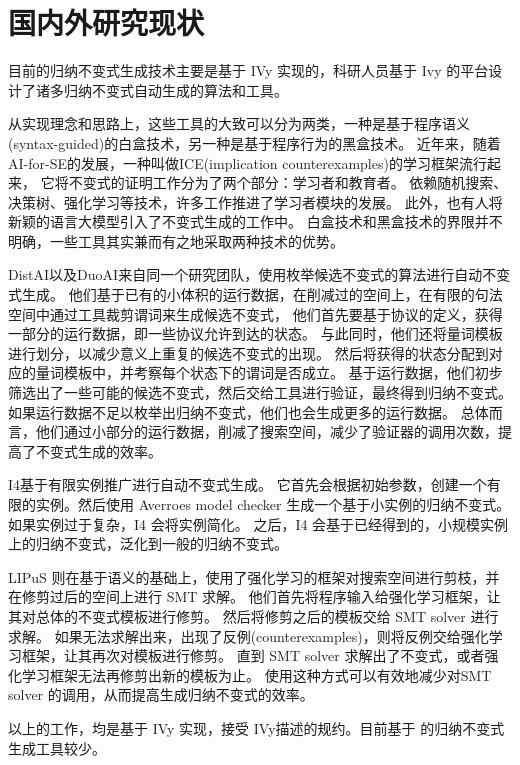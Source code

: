 \section{国内外研究现状}
目前的归纳不变式生成技术主要是基于 IVy 实现的，科研人员基于 Ivy 的平台设计了诸多归纳不变式自动生成的算法和工具。

从实现理念和思路上，这些工具的大致可以分为两类，一种是基于程序语义(syntax-guided)\cite{syntax}的白盒技术，另一种是基于程序行为的黑盒技术。
近年来，随着 AI-for-SE的发展，一种叫做ICE\cite{ICE}(implication counterexamples)的学习框架流行起来，
它将不变式的证明工作分为了两个部分：学习者和教育者。
依赖随机搜索、决策树\cite{garg2016learning}、强化学习\cite{LIPuS}等技术，许多工作推进了学习者模块的发展。
此外，也有人将新颖的语言大模型引入了不变式生成的工作中\cite{llm}。
白盒技术和黑盒技术的界限并不明确，一些工具其实兼而有之地采取两种技术的优势。

DistAI\cite{DistAI}以及DuoAI\cite{DuoAI}来自同一个研究团队，使用枚举候选不变式的算法进行自动不变式生成。
他们基于已有的小体积的运行数据，在削减过的空间上，在有限的句法空间中通过工具裁剪谓词来生成候选不变式，
他们首先要基于协议的定义，获得一部分的运行数据，即一些协议允许到达的状态。
与此同时，他们还将量词模板进行划分，以减少意义上重复的候选不变式的出现。
然后将获得的状态分配到对应的量词模板中，并考察每个状态下的谓词是否成立。
基于运行数据，他们初步筛选出了一些可能的候选不变式，然后交给工具进行验证，最终得到归纳不变式。
如果运行数据不足以枚举出归纳不变式，他们也会生成更多的运行数据。
总体而言，他们通过小部分的运行数据，削减了搜索空间，减少了验证器的调用次数，提高了不变式生成的效率。

I4\cite{I4}基于有限实例推广进行自动不变式生成。
它首先会根据初始参数，创建一个有限的实例。然后使用 Averroes model checker \cite{goel2019model}生成一个基于小实例的归纳不变式。
如果实例过于复杂，I4 会将实例简化。
之后，I4 会基于已经得到的，小规模实例上的归纳不变式，泛化到一般的归纳不变式。

LIPuS 则在基于语义的基础上，使用了强化学习的框架对搜索空间进行剪枝，并在修剪过后的空间上进行 SMT 求解。
他们首先将程序输入给强化学习框架，让其对总体的不变式模板进行修剪。
然后将修剪之后的模板交给 SMT solver 进行求解。
如果无法求解出来，出现了反例(counterexamples)，则将反例交给强化学习框架，让其再次对模板进行修剪。
直到 SMT solver 求解出了不变式，或者强化学习框架无法再修剪出新的模板为止。
使用这种方式可以有效地减少对SMT solver 的调用，从而提高生成归纳不变式的效率。

以上的工作，均是基于 IVy 实现，接受 IVy描述的规约。目前基于 \TLA 的归纳不变式生成工具较少。

